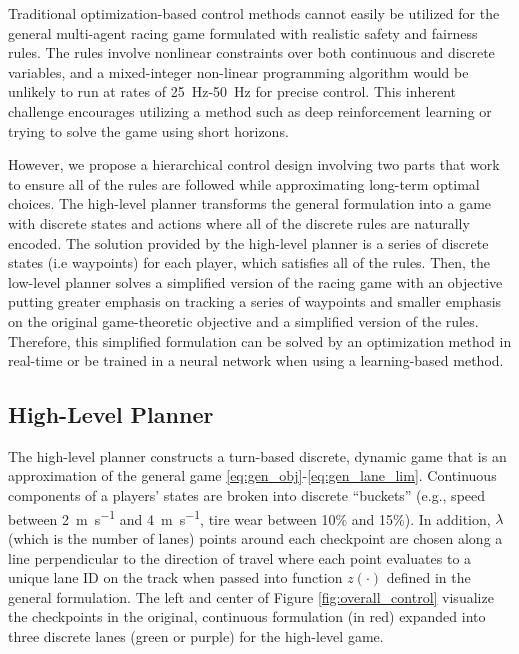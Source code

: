 Traditional optimization-based control methods cannot easily be utilized for the general multi-agent racing game formulated with realistic safety and fairness rules. The rules involve nonlinear constraints over both continuous and discrete variables, and a mixed-integer non-linear programming algorithm would be unlikely to run at rates of \SI{25}{\hertz}-\SI{50}{\hertz} for precise control. This inherent challenge encourages utilizing a method such as deep reinforcement learning or trying to solve the game using short horizons. 

However, we propose a hierarchical control design involving two parts that work to ensure all of the rules are followed while approximating long-term optimal choices. The high-level planner transforms the general formulation into a game with discrete states and actions where all of the discrete rules are naturally encoded. The solution provided by the high-level planner is a series of discrete states (i.e waypoints) for each player, which satisfies all of the rules. Then, the low-level planner solves a simplified version of the racing game with an objective putting greater emphasis on tracking a series of waypoints and smaller emphasis on the original game-theoretic objective and a simplified version of the rules. Therefore, this simplified formulation can be solved by an optimization method in real-time or be trained in a neural network when using a learning-based method. 
\subsection{High-Level Planner}
The high-level planner constructs a turn-based discrete, dynamic game that is an approximation of the general game \eqref{eq:gen_obj}-\eqref{eq:gen_lane_lim}. Continuous components of a players' states are broken into discrete ``buckets'' (e.g., speed between \SI{2}{\meter\per\second} and \SI{4}{\meter\per\second}, tire wear between 10\% and 15\%). In addition, $\lambda$ (which is the number of lanes) points around each checkpoint are chosen along a line perpendicular to the direction of travel where each point evaluates to a unique lane ID on the track when passed into function $z(\cdot)$ defined in the general formulation. The left and center of Figure \ref{fig:overall_control} visualize the checkpoints in the original, continuous formulation (in red) expanded into three discrete lanes (green or purple) for the high-level game.  

